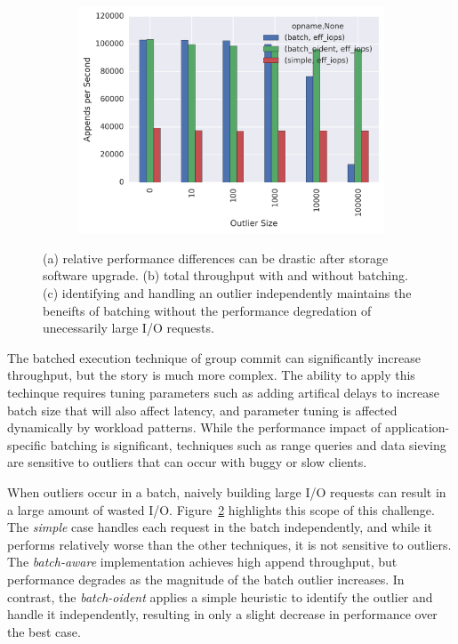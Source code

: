 \begin{figure}[t]
\begin{subfigure}[b]{.33\linewidth}
        \includegraphics[width=1.0\linewidth]{batching-outlier-detect.png}
        \caption{}
        \label{fig:batching-outlier}
    \end{subfigure}
    \caption{(a) relative performance differences can be drastic after storage
    software upgrade. (b) total throughput with and without batching.  (c)
    identifying and handling an outlier independently maintains the beneifts
    of batching without the performance degredation of unecessarily large I/O
    requests.}
\end{figure}


The batched execution technique of group commit can significantly increase
throughput, but the story is much more complex. The ability to apply this
techinque requires tuning parameters such as adding artifical delays to
increase batch size that will also affect latency, and parameter tuning is
affected dynamically by workload patterns.  While the performance impact of
application-specific batching is significant, techniques such as range queries
and data sieving are sensitive to outliers that can occur with buggy or slow
clients.

When outliers occur in a batch, naively building large I/O requests can result
in a large amount of wasted I/O.  Figure~\ref{fig:batching-outlier} highlights
this scope of this challenge. The \emph{simple} case handles each request in
the batch independently, and while it performs relatively worse than the other
techniques, it is not sensitive to outliers. The \emph{batch-aware}
implementation achieves high append throughput, but performance degrades as
the magnitude of the batch outlier increases. In contrast, the
\emph{batch-oident} applies a simple heuristic to identify the outlier and
handle it independently, resulting in only a slight decrease in performance
over the best case.

